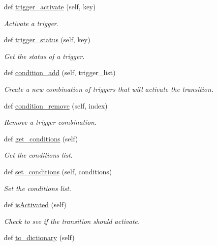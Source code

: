 \begin{DoxyCompactItemize}
def \hyperlink{classmain_1_1_transition_a8c4baad399a3c41f2f6d8c7c74f6db51}{trigger\+\_\+activate} (self, key)
\begin{DoxyCompactList}\small\item\em Activate a trigger. \end{DoxyCompactList}\item 
def \hyperlink{classmain_1_1_transition_acbbb9b31789620185ecfd420958457d5}{trigger\+\_\+status} (self, key)
\begin{DoxyCompactList}\small\item\em Get the status of a trigger. \end{DoxyCompactList}\item 
def \hyperlink{classmain_1_1_transition_a3d7379857189a9e58da009fc12bc0c04}{condition\+\_\+add} (self, trigger\+\_\+list)
\begin{DoxyCompactList}\small\item\em Create a new combination of triggers that will activate the transition. \end{DoxyCompactList}\item 
def \hyperlink{classmain_1_1_transition_a815821a5428745e7aca8eb6c31068605}{condition\+\_\+remove} (self, index)
\begin{DoxyCompactList}\small\item\em Remove a trigger combination. \end{DoxyCompactList}\item 
def \hyperlink{classmain_1_1_transition_a54517857aaf67b0ba159306854e9b91f}{get\+\_\+conditions} (self)
\begin{DoxyCompactList}\small\item\em Get the conditions list. \end{DoxyCompactList}\item 
def \hyperlink{classmain_1_1_transition_a48a94866892cd2c66cd7e0a6c0c63d82}{set\+\_\+conditions} (self, conditions)
\begin{DoxyCompactList}\small\item\em Set the conditions list. \end{DoxyCompactList}\item 
def \hyperlink{classmain_1_1_transition_aff9bd394ea25ea0eccb698001562514e}{is\+Activated} (self)
\begin{DoxyCompactList}\small\item\em Check to see if the transition should activate. \end{DoxyCompactList}\item 
def \hyperlink{classmain_1_1_transition_a101d38d21ff5a3a8179b85cd58c9d229}{to\+\_\+dictionary} (self)

\end{DoxyCompactItemize}
